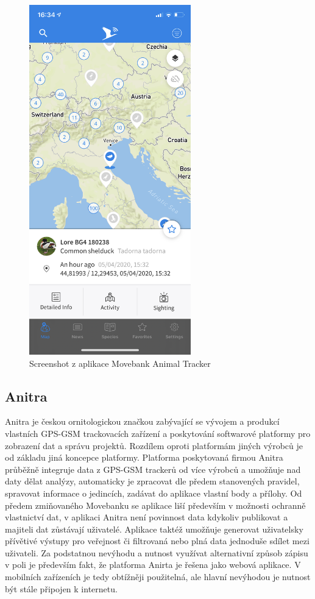 \begin{figure}[h]
	\begin{center}
		\includegraphics[width=70mm]{img/animaltracker_app_movebank.png}
	\end{center}
	\caption{Screenshot z aplikace Movebank Animal Tracker}
	\label{fig:movebank}
\end{figure}


\subsection{Anitra}

Anitra je českou ornitologickou značkou zabývající se vývojem a produkcí vlastních GPS-GSM trackovacích zařízení a poskytování softwarové platformy pro zobrazení dat a správu projektů. Rozdílem oproti platformám jiných výrobců je od základu jiná koncepce platformy. Platforma poskytovaná firmou Anitra průběžně integruje data z GPS-GSM trackerů od více výrobců a umožňuje nad daty dělat analýzy, automaticky je zpracovat dle předem stanovených pravidel, spravovat informace o jedincích, zadávat do aplikace vlastní body a přílohy. Od předem zmiňovaného Movebanku se aplikace liší především v možnosti ochranně vlastnictví dat, v aplikaci Anitra není povinnost data kdykoliv publikovat a majiteli dat zůstávají uživatelé. Aplikace taktéž umožňuje generovat uživatelsky přívětivé výstupy pro veřejnost či filtrovaná nebo plná data jednoduše sdílet mezi uživateli. Za podstatnou nevýhodu a nutnost využívat alternativní způsob zápisu v poli je především fakt, že platforma Anirta je řešena jako webová aplikace. V mobilních zařízeních je tedy obtížněji použitelná, ale hlavní nevýhodou je nutnost být stále připojen k internetu.

